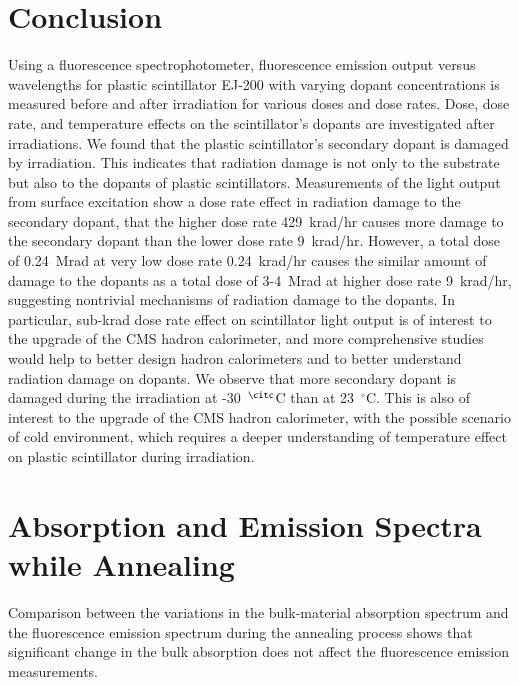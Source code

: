 \documentclass[review]{elsarticle}
\begin{document}
\section{Conclusion}
Using a fluorescence spectrophotometer, fluorescence emission output versus wavelengths for plastic scintillator EJ-200 with varying 
dopant concentrations is measured before and after irradiation for various doses and dose rates. 
Dose, dose rate, and temperature effects on the scintillator's dopants are investigated after irradiations.
We found that the plastic scintillator's secondary dopant is damaged by irradiation. 
This indicates that radiation damage is not only to the substrate but also to the dopants of plastic scintillators. 
Measurements of the light output from surface excitation show a dose rate effect in radiation damage to the secondary dopant, 
that the higher dose rate 429~krad/hr causes more damage to the secondary dopant than the lower dose rate 9~krad/hr. 
However, a total dose of 0.24~Mrad at very low dose rate 0.24~krad/hr causes the similar amount of damage to the dopants as 
a total dose of 3-4~Mrad at higher dose rate 9~krad/hr, suggesting nontrivial mechanisms of radiation damage to the dopants. 
In particular, sub-krad dose rate effect on scintillator light output is of interest to the upgrade of the CMS hadron calorimeter, 
and more comprehensive studies would help to better design hadron calorimeters and to better understand radiation damage on dopants.
We observe that more secondary dopant is damaged during the irradiation at -30~$^\citc$C than at 23~$^\circ$C. 
This is also of interest to the upgrade of the CMS hadron calorimeter, with the possible scenario of cold environment, 
which requires a deeper understanding of temperature effect on plastic scintillator during irradiation. 


\appendix

\section{Absorption and Emission Spectra while Annealing}

Comparison between the variations in the bulk-material absorption spectrum and the fluorescence emission spectrum 
during the annealing process shows that significant change in the bulk absorption does not affect the fluorescence emission measurements. 
\end{document}
